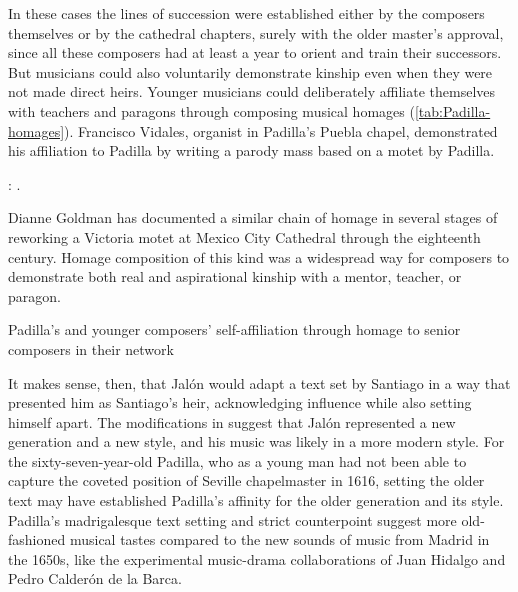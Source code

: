 In these cases the lines of succession were established either by the composers
themselves or by the cathedral chapters, surely with the older master's
approval, since all these composers had at least a year to orient and train
their successors.
But musicians could also voluntarily demonstrate kinship even when they were not
made direct heirs. 
Younger musicians could deliberately affiliate themselves with teachers and
paragons through composing musical homages (\cref{tab:Padilla-homages}).
Francisco Vidales, organist in Padilla's Puebla chapel, demonstrated his
affiliation to Padilla by writing a parody mass based on a motet by Padilla.%
\begin{Footnote}
    \Autocite{Koegel:Padilla}: .
\end{Footnote}
Dianne Goldman has documented a similar chain of homage in several stages of
reworking a Victoria motet at Mexico City Cathedral through the eighteenth
century.%
    \Autocite{Goldman:StileAntico}
Homage composition of this kind was a widespread way for composers to
demonstrate both real and aspirational kinship with a mentor, teacher, or
paragon.

\begin{table}
    \caption{Padilla's  and younger composers' self-affiliation
    through homage to senior composers in their network}
  
    \label{tab:Padilla-homages}
\end{table}

It makes sense, then, that Jalón would adapt a text set by Santiago in a way
that presented him as Santiago's heir, acknowledging influence while also
setting himself apart.
The modifications in  suggest that Jalón
represented a new generation and a new style, and his music was likely in a more
modern style.
For the sixty-seven-year-old Padilla, who as a young man had not been able to
capture the coveted position of Seville chapelmaster in 1616, setting the older
text may have established Padilla's affinity for the older generation and its
style.
Padilla's madrigalesque text setting and strict counterpoint suggest more
old-fashioned musical tastes compared to the new sounds of music from Madrid in
the 1650s, like the experimental music-drama collaborations of Juan Hidalgo and
Pedro Calderón de la Barca.%
    \Autocite{Stein:Songs}


